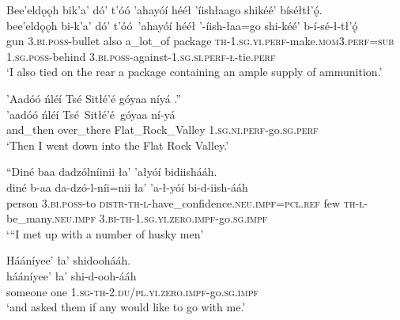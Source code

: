 \ea\label{ex:text2-11-4}
Bee’eldǫǫh bik’a’ dó’ t’óó ’ahayóí hééł ’íishłaago shikéé’ bíséłtł’ǫ́.\\
\gll bee’eldǫǫh	bi-k’a’	dó’	t’óó~{’ahayóí}	hééł	’-íish-łaa=go	shi-kéé’	b-í-sé-ł-tł’ǫ́\\
     gun	3.\textsc{bi}.\textsc{poss}-bullet	also	a\_lot\_of	package	\textsc{th}-1.\textsc{sg}.\textsc{yi}.\textsc{perf}-make.\textsc{mom}3.\textsc{perf}=\textsc{sub}	1.\textsc{sg}.\textsc{poss}-behind	3.\textsc{bi}.\textsc{poss}-against-1.\textsc{sg}.\textsc{si}.\textsc{perf}-\textsc{ł}-tie.\textsc{perf}\\
\glt `I also tied on the rear a package containing an ample supply of ammunition.'
\z

\ea\label{ex:text2-11-5}
’Aadóó ńléí Tsé Sitłé’é góyaa níyá .''\\
\gll ’aadóó	ńléí	Tsé~Sitłé’é~{góyaa}	ní-yá\\
     and\_then	over\_there	Flat\_Rock\_Valley	1.\textsc{sg}.\textsc{ni}.\textsc{perf}-go.\textsc{sg}.\textsc{perf}\\
\glt `Then I went down into the Flat Rock Valley.'
\z

\ea\label{ex:text2-12-1}
``Diné baa dadzólníinii ła’ ’ałyóí bidiishááh.\\
\gll diné	b-aa	da-dzó-l-níi=nii	ła’	’a-ł-yóí	bi-d-iish-ááh\\
     person	3.\textsc{bi}.\textsc{poss}-to	\textsc{distr}-\textsc{th}-\textsc{l}-have\_confidence.\textsc{neu}.\textsc{impf}=\textsc{pcl}.\textsc{ref}	few	\textsc{th}-\textsc{ł}-be\_many.\textsc{neu}.\textsc{impf}	3.\textsc{bi}-\textsc{th}-1.\textsc{sg}.\textsc{yi}.\textsc{zero}.\textsc{impf}-go.\textsc{sg}.\textsc{impf}\\
\glt `{``}I met up with a number of husky men'
\z

\ea\label{ex:text2-12-2}
Hááníyee’ ła’ shidoohááh.\\
\gll hááníyee’	ła’	shi-d-ooh-ááh\\
     someone	one	1.\textsc{sg}-\textsc{th}-2.\textsc{du}/\textsc{pl}.\textsc{yi}.\textsc{zero}.\textsc{impf}-go.\textsc{sg}.\textsc{impf}\\
\glt `and asked them if any would like to go with me.'
\z

